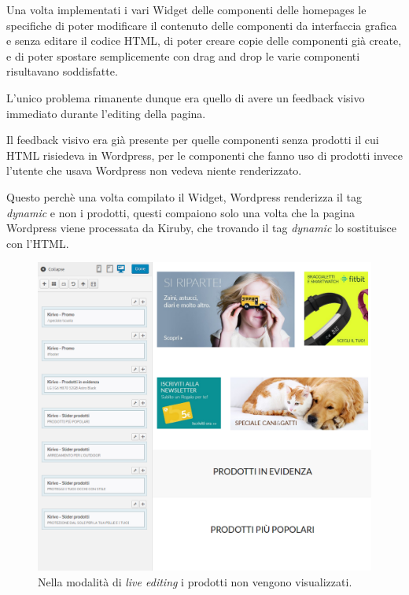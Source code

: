 


Una volta implementati i vari Widget delle componenti delle homepages le specifiche di poter
modificare il contenuto delle componenti da interfaccia grafica e senza editare
il codice HTML, di poter creare copie delle componenti già create, e di poter spostare
semplicemente con drag and drop le varie componenti risultavano soddisfatte.

L'unico problema rimanente dunque era quello di avere un feedback visivo immediato durante l'editing della pagina.

Il feedback visivo era già presente per quelle componenti senza prodotti il cui HTML risiedeva in Wordpress,
per le componenti che fanno uso di prodotti invece l'utente che usava Wordpress non vedeva niente renderizzato.

Questo perchè una volta compilato il Widget, Wordpress renderizza il tag \emph{dynamic} e non i prodotti,
questi compaiono solo una volta che la pagina Wordpress viene processata da Kiruby, che trovando il tag \emph{dynamic}
lo sostituisce con l'HTML.

\begin{figure}
  \includegraphics[width=\textwidth]{figure/noapi.png}
  \caption{Nella modalità di \emph{live editing} i prodotti non vengono visualizzati.}
  \label{fig:kspec}
\end{figure}

